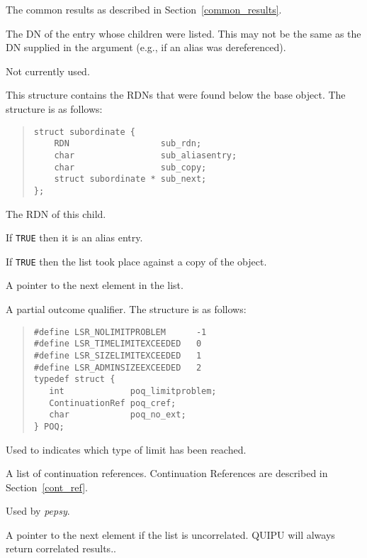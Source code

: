 \begin{describe}
\item [\verb"lsr\_common":] The common results as described in
Section~\ref{common_results}.
\item [\verb"lsr\_object":]The DN of the entry whose children were listed.
This may not be the same as the DN supplied in the argument (e.g.,
if an alias was dereferenced). 
\item [\verb"lsr\_age":] Not currently used.
\item [\verb"lsr\_subordinates":] This structure contains the RDNs
that were found below the base object.  The structure is as follows:
\begin{quote}\small\begin{verbatim}
struct subordinate {
    RDN                  sub_rdn;
    char                 sub_aliasentry; 
    char                 sub_copy;
    struct subordinate * sub_next;
};
\end{verbatim}\end{quote}

\begin{describe}
\item [\verb"sub\_rdn":] The RDN of this child.
\item [\verb"sub\_aliasentry":] If \verb"TRUE" then it is an alias entry.
\item [\verb"sub\_copy":] If \verb"TRUE" then the list took place
against a copy of the object.
\item [\verb"sub\_next":] A pointer to the next element in the list.
\end{describe}

\item [\verb"lsr\_poq":] A partial outcome qualifier. The structure is
as follows:
\begin{quote}\small\begin{verbatim}
#define LSR_NOLIMITPROBLEM      -1
#define LSR_TIMELIMITEXCEEDED   0
#define LSR_SIZELIMITEXCEEDED   1
#define LSR_ADMINSIZEEXCEEDED   2
typedef struct {
   int             poq_limitproblem;
   ContinuationRef poq_cref;
   char            poq_no_ext;
} POQ;
\end{verbatim}\end{quote}

\begin{describe}
\item [\verb"poq\_limitproblem":] Used to indicates which type of limit has
been reached.
\item [\verb"poq\_cref":] A list of continuation references.
Continuation References are described in 
Section~\ref{cont_ref}.
\item [\verb"poq\_no\_ext":] Used by {\em pepsy}.
\end{describe}
\item [\verb"lsr\_next":] A pointer to the next element if the list is
uncorrelated.  QUIPU will always return correlated results..
\end{describe}

